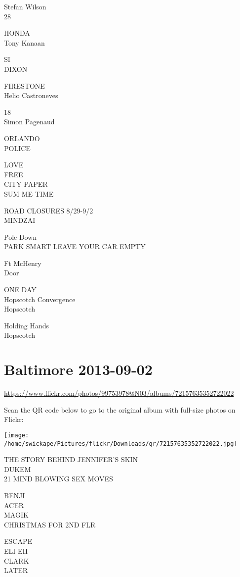 \documentclass[10pt,letterpaper]{article}
\begin{document}
Stefan Wilson\\
28

HONDA\\
Tony Kanaan

SI\\
DIXON

FIRESTONE\\
Helio Castroneves

18\\
Simon Pagenaud

ORLANDO\\
POLICE

LOVE\\
FREE\\
CITY PAPER\\
SUM ME TIME

ROAD CLOSURES 8/29{-}9/2\\
MINDZAI

Pole Down\\
PARK SMART LEAVE YOUR CAR EMPTY

Ft McHenry\\
Door

ONE DAY\\
Hopscotch Convergence\\
Hopscotch

Holding Hands\\
Hopscotch
\pagebreak

\section*{Baltimore 2013-09-02}

\url{https://www.flickr.com/photos/99753978@N03/albums/72157635352722022}

Scan the QR code below to go to the original album with full-size photos on Flickr:

\texttt{[image: /home/swickape/Pictures/flickr/Downloads/qr/72157635352722022.jpg]}
\pagebreak

THE STORY BEHIND JENNIFER'S SKIN\\
DUKEM\\
21 MIND BLOWING SEX MOVES

BENJI\\
ACER\\
MAGIK\\
CHRISTMAS FOR 2ND FLR

ESCAPE\\
ELI EH\\
CLARK\\
LATER
\end{document}
